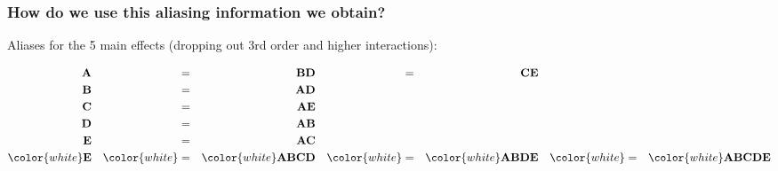 \documentclass[handout,11pt,aspectratio=169,mathserif]{beamer}
\begin{document}
\begin{frame}\frametitle{How do we use this aliasing information we obtain?}
	
	\vspace{1cm}
	Aliases for the 5 main effects (dropping out 3rd order and higher interactions):
	
	\vspace{0.5cm}
	\begin{align*}
		\textbf{A} &&=&& \textbf{BD} &&=&& \textbf{CE} \\
		\textbf{B} &&=&& \textbf{AD} &&&& &&&& \\
		\textbf{C} &&=&& \textbf{AE} &&&& &&&& \\
		\textbf{D} &&=&& \textbf{AB} &&&& &&&& \\
		\textbf{E} &&=&& \textbf{AC} &&&& &&&& \\
		\color{white}  \textbf{E} &&\color{white}=&& \color{white} \textbf{ABCD}	 &&\color{white}=&& \color{white} \textbf{ABDE}	&&\color{white}=&& \color{white} \textbf{ABCDE}
	\end{align*}
		
	
\end{frame}
\end{document}
